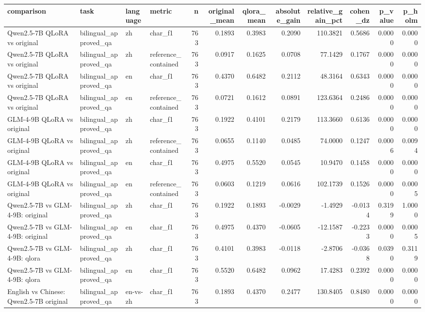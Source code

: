 \begin{tabular}{llllrrrrrrrr}
\toprule
comparison & task & language & metric & n & original_mean & qlora_mean & absolute_gain & relative_gain_pct & cohen_dz & p_value & p_holm \\
\midrule
Qwen2.5-7B QLoRA vs original & bilingual_approved_qa & zh & char_f1 & 763 & 0.1893 & 0.3983 & 0.2090 & 110.3821 & 0.5686 & 0.0000 & 0.0000 \\
Qwen2.5-7B QLoRA vs original & bilingual_approved_qa & zh & reference_contained & 763 & 0.0917 & 0.1625 & 0.0708 & 77.1429 & 0.1767 & 0.0000 & 0.0000 \\
Qwen2.5-7B QLoRA vs original & bilingual_approved_qa & en & char_f1 & 763 & 0.4370 & 0.6482 & 0.2112 & 48.3164 & 0.6343 & 0.0000 & 0.0000 \\
Qwen2.5-7B QLoRA vs original & bilingual_approved_qa & en & reference_contained & 763 & 0.0721 & 0.1612 & 0.0891 & 123.6364 & 0.2486 & 0.0000 & 0.0000 \\
GLM-4-9B QLoRA vs original & bilingual_approved_qa & zh & char_f1 & 763 & 0.1922 & 0.4101 & 0.2179 & 113.3660 & 0.6136 & 0.0000 & 0.0000 \\
GLM-4-9B QLoRA vs original & bilingual_approved_qa & zh & reference_contained & 763 & 0.0655 & 0.1140 & 0.0485 & 74.0000 & 0.1247 & 0.0006 & 0.0094 \\
GLM-4-9B QLoRA vs original & bilingual_approved_qa & en & char_f1 & 763 & 0.4975 & 0.5520 & 0.0545 & 10.9470 & 0.1458 & 0.0000 & 0.0000 \\
GLM-4-9B QLoRA vs original & bilingual_approved_qa & en & reference_contained & 763 & 0.0603 & 0.1219 & 0.0616 & 102.1739 & 0.1526 & 0.0000 & 0.0005 \\
Qwen2.5-7B vs GLM-4-9B: original & bilingual_approved_qa & zh & char_f1 & 763 & 0.1922 & 0.1893 & -0.0029 & -1.4929 & -0.0134 & 0.3199 & 1.0000 \\
Qwen2.5-7B vs GLM-4-9B: original & bilingual_approved_qa & en & char_f1 & 763 & 0.4975 & 0.4370 & -0.0605 & -12.1587 & -0.2233 & 0.0000 & 0.0005 \\
Qwen2.5-7B vs GLM-4-9B: qlora & bilingual_approved_qa & zh & char_f1 & 763 & 0.4101 & 0.3983 & -0.0118 & -2.8706 & -0.0368 & 0.0390 & 0.3119 \\
Qwen2.5-7B vs GLM-4-9B: qlora & bilingual_approved_qa & en & char_f1 & 763 & 0.5520 & 0.6482 & 0.0962 & 17.4283 & 0.2392 & 0.0000 & 0.0000 \\
English vs Chinese: Qwen2.5-7B original & bilingual_approved_qa & en-vs-zh & char_f1 & 763 & 0.1893 & 0.4370 & 0.2477 & 130.8405 & 0.8480 & 0.0000 & 0.0000 \\

\end{tabular}
